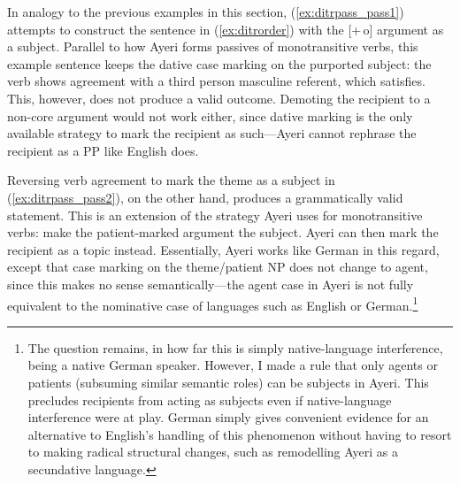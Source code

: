 In analogy to the previous examples in this section, (\ref{ex:ditrpass_pass1})
attempts to construct the sentence in (\ref{ex:ditrorder}) with the [+\,o]
argument as a subject. Parallel to how Ayeri forms passives of monotransitive
verbs, this example sentence keeps the dative case marking on the purported
subject: the verb shows agreement with a third person masculine referent, which
 satisfies. This, however, does not produce a valid
outcome. Demoting the recipient to a non-core argument would not work either,
since dative marking is the only available strategy to mark the recipient as
such---Ayeri cannot rephrase the recipient as a PP like English does.

Reversing verb agreement to mark the theme as a subject in
(\ref{ex:ditrpass_pass2}), on the other hand, produces a grammatically valid
statement. This is an extension of the strategy Ayeri uses for monotransitive
verbs: make the patient-marked argument the subject. Ayeri can then mark the
recipient as a topic instead. Essentially, Ayeri works like German in this
regard, except that case marking on the theme/patient NP does not change to
agent, since this makes no sense semantically---the agent case in Ayeri is not
fully equivalent to the nominative case of languages such as English or
German.\footnote{The question remains, in how far this is simply
native-language interference, being a native German speaker. However, I made a
rule that only agents or patients (subsuming similar semantic roles) can be
subjects in Ayeri. This precludes recipients from acting as subjects even if
native-language interference were at play. German simply gives convenient
evidence for an alternative to English's handling of this phenomenon without
having to resort to making radical structural changes, such as remodelling
Ayeri as a secundative language.}

